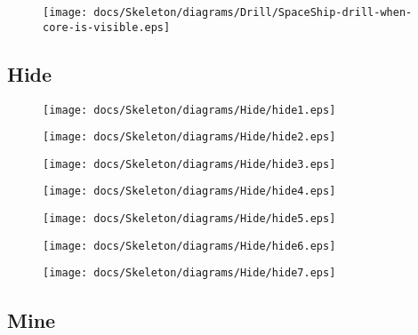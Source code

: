\begin{figure}[H] 
    \centering 
    \texttt{[image: docs/Skeleton/diagrams/Drill/SpaceShip-drill-when-core-is-visible.eps]} 
    \caption{} 
\end{figure} 

\subsection{Hide}

\begin{figure}[H] 
    \centering 
    \texttt{[image: docs/Skeleton/diagrams/Hide/hide1.eps]} 
    \caption{} 
\end{figure} 

\begin{figure}[H] 
    \centering 
    \texttt{[image: docs/Skeleton/diagrams/Hide/hide2.eps]} 
    \caption{} 
\end{figure} 

\begin{figure}[H] 
    \centering 
    \texttt{[image: docs/Skeleton/diagrams/Hide/hide3.eps]} 
    \caption{} 
\end{figure} 

\begin{figure}[H] 
    \centering 
    \texttt{[image: docs/Skeleton/diagrams/Hide/hide4.eps]} 
    \caption{} 
\end{figure} 

\begin{figure}[H] 
    \centering 
    \texttt{[image: docs/Skeleton/diagrams/Hide/hide5.eps]} 
    \caption{} 
\end{figure} 

\begin{figure}[H] 
    \centering 
    \texttt{[image: docs/Skeleton/diagrams/Hide/hide6.eps]} 
    \caption{} 
\end{figure} 

\begin{figure}[H] 
    \centering 
    \texttt{[image: docs/Skeleton/diagrams/Hide/hide7.eps]} 
    \caption{} 
\end{figure} 

\subsection{Mine}

